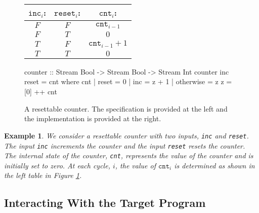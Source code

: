 \documentclass[]{article}
\theoremstyle{example}
\newtheorem{example}{Example}
\begin{document}
\begin{figure}
\begin{minipage}{0.4\linewidth}
\begin{tabular}{c|c||c}
$\mathtt{inc}_i$: & $\mathtt{reset}_i$: & $\mathtt{cnt}_i$: \\
\hline
$F$ & $F$ & $\mathtt{cnt}_{i-1}$ \\
\hline
$F$ & $T$ & $0$ \\
\hline
$T$ & $F$ & $\mathtt{cnt}_{i-1} + 1$ \\
\hline
$T$ & $T$ & $0$
\end{tabular}
\end{minipage}
\hspace{1cm}
\begin{minipage}{0.6\linewidth}
\begin{code}
counter :: Stream Bool -> Stream Bool 
        -> Stream Int
counter inc reset = cnt
  where
    cnt | reset     = 0
        | inc       = z + 1
        | otherwise = z
    z = [0] ++ cnt
\end{code}
\end{minipage}
\caption{A resettable counter. The specification is provided at the left and the
implementation is provided at the right.
}
\label{fig:counter}
\end{figure}

\begin{example}
We consider a resettable counter with two inputs, {\tt inc} and {\tt reset}.
The input {\tt inc} increments the counter and the input {\tt reset} resets the
counter. The internal state of the counter, {\tt cnt}, represents the value of the
counter and is initially set to zero. At each cycle, $i$, the value of
$\mathtt{cnt}_i$ is determined as shown in the left table in Figure
\ref{fig:counter}.
\end{example}


\subsection{Interacting With the Target Program}
\label{sec:interacting}
\end{document}
